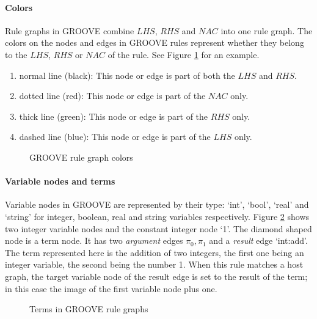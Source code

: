 \paragraph*{Colors}
Rule graphs in GROOVE combine $\mathit{LHS}$, $\mathit{RHS}$ and $\mathit{NAC}$ into one rule graph. The colors on the nodes and edges in GROOVE rules represent whether they belong to the $\mathit{LHS}$, $\mathit{RHS}$ or $\mathit{NAC}$ of the rule. See Figure \ref{fig:colors} for an example.
\begin{enumerate}
  \item normal line (black): This node or edge is part of both the $\mathit{LHS}$ and $\mathit{RHS}$.
  \item dotted line (red): This node or edge is part of the $\mathit{NAC}$ only.
  \item thick line (green): This node or edge is part of the $\mathit{RHS}$ only.
  \item dashed line (blue): This node or edge is part of the $\mathit{LHS}$ only.
\end{enumerate}

\begin{figure}[h]
  \begin{center}
    
  \end{center}
  \caption{GROOVE rule graph colors}
  \label{fig:colors}
\end{figure}

\paragraph*{Variable nodes and terms}
Variable nodes in GROOVE are represented by their type: `int', `bool', `real' and `string' for integer, boolean, real and string variables respectively. Figure \ref{fig:terms} shows two integer variable nodes and the constant integer node `1'. The diamond shaped node is a term node. It has two \textit{argument} edges $\pi_0, \pi_1$ and a \textit{result} edge `int:add'. The term represented here is the addition of two integers, the first one being an integer variable, the second being the number 1. When this rule matches a host graph, the target variable node of the result edge is set to the result of the term; in this case the image of the first variable node plus one.

\begin{figure}[h]
  \begin{center}
    
  \end{center}
  \caption{Terms in GROOVE rule graphs}
  \label{fig:terms}
\end{figure}

